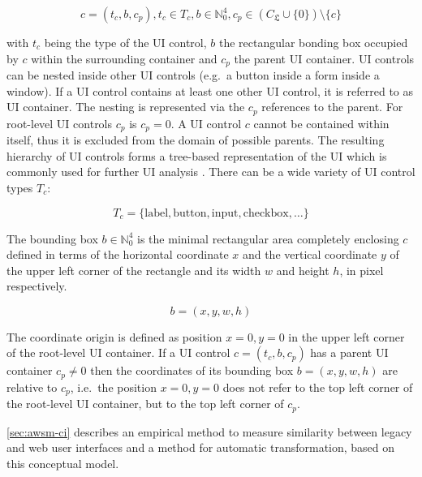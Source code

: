 \begin{equation}c =(t_c, b, c_p), t_c \in T_c, b \in \mathbb{N}_0^4, c_p \in (C_{\mathfrak{L}} \cup \{0\}) \setminus \{c\} \label{eq:ui-control}\end{equation}

with \(t_c\) being the type of the UI control, \(b\) the rectangular bonding box occupied by \(c\) within the surrounding container and \(c_p\) the parent UI container.
UI controls can be nested inside other UI controls (e.g.~a button inside a form inside a window).
If a UI control contains at least one other UI control, it is referred to as UI container.
The nesting is represented via the \(c_p\) references to the parent.
For root-level UI controls \(c_p\) is \(c_p = 0\).
A UI control \(c\) cannot be contained within itself, thus it is excluded from the domain of possible parents.
The resulting hierarchy of UI controls forms a tree-based representation of the UI which is commonly used for further UI analysis \autocite{Grechanik2018,RoyChoudhary2014XPERT,Sanoja2014,Cai2003VIPS}.
There can be a wide variety of UI control types \(T_c\):

\begin{equation}T_c =  \{\textrm{label}, \textrm{button}, \textrm{input}, \textrm{checkbox}, \ldots\}\label{eq:ui-types}\end{equation}

The bounding box \(b \in \mathbb{N}_0^4\) is the minimal rectangular area completely enclosing \(c\) defined in terms of the horizontal coordinate \(x\) and the vertical coordinate \(y\) of the upper left corner of the rectangle and its width \(w\) and height \(h\), in pixel respectively.

\begin{equation}b = (x,y,w,h)\label{eq:bounding-box}\end{equation}

The coordinate origin is defined as position \(x=0, y=0\) in the upper left corner of the root-level UI container.
If a UI control \(c = (t_c, b, c_p)\) has a parent UI container \(c_p \neq 0\) then the coordinates of its bounding box \(b=(x,y,w,h)\) are relative to \(c_p\), i.e.~the position \(x=0, y=0\) does not refer to the top left corner of the root-level UI container, but to the top left corner of \(c_p\).

\cref{sec:awsm-ci} describes an empirical method to measure similarity between legacy and web user interfaces and a method for automatic transformation, based on this conceptual model.

